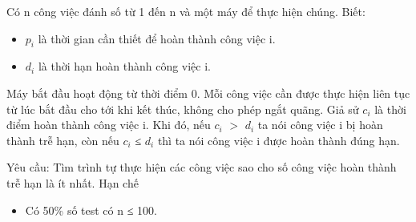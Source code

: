 Có n công việc đánh số từ 1 đến n và một máy để thực hiện chúng. Biết:  
\begin{itemize}
	\item     $p_{i}$    là thời gian cần thiết để hoàn thành công việc i.   
	\item     $d_{i}$    là thời hạn hoàn thành công việc i.   
\end{itemize}

   Máy bắt đầu hoạt động từ thời điểm 0. Mỗi công việc cần được thực hiện liên tục từ lúc bắt đầu cho tới khi kết thúc, không cho phép ngắt quãng. Giả sử $c_{i}$   là thời điểm hoàn thành công việc i. Khi đó, nếu $c_{i}$   $>$  $d_{i}$   ta nói công việc i bị hoàn thành trễ hạn, còn nếu  $c_{i}$   ≤ $d_{i}$   thì ta nói công việc i được hoàn thành đúng hạn.  

   Yêu cầu: Tìm trình tự thực hiện các công việc sao cho số công việc hoàn thành trễ hạn là ít nhất.
   Hạn chế  
\begin{itemize}
	\item     Có 50\% số test có n ≤ 100.   
\end{itemize}